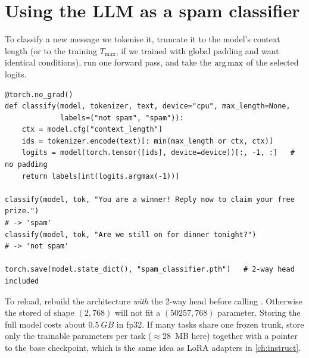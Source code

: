 \section{Using the LLM as a spam classifier}\label{sec:classify:use}

To classify a new message we tokenise it, truncate it to the model's context
length (or to the training $T_{\max}$, if we trained with global padding and want
identical conditions), run one forward pass, and take the $\operatorname*{arg\,max}$ of the selected
logits.

\begin{lstlisting}[caption={Inference with the fine-tuned classifier.},label={lst:classify:infer}]
@torch.no_grad()
def classify(model, tokenizer, text, device="cpu", max_length=None,
             labels=("not spam", "spam")):
    ctx = model.cfg["context_length"]
    ids = tokenizer.encode(text)[: min(max_length or ctx, ctx)]
    logits = model(torch.tensor([ids], device=device))[:, -1, :]   # no padding
    return labels[int(logits.argmax(-1))]

classify(model, tok, "You are a winner! Reply now to claim your free prize.")
# -> 'spam'
classify(model, tok, "Are we still on for dinner tonight?")
# -> 'not spam'

torch.save(model.state_dict(), "spam_classifier.pth")   # 2-way head included
\end{lstlisting}

To reload, rebuild the architecture \emph{with} the 2-way head before calling
. Otherwise the stored  of shape
$(2, 768)$ will not fit a $(50257, 768)$ parameter. Storing the full model costs about
$\SI{0.5}{GB}$ in fp32. If many tasks share one frozen trunk, store only the
trainable parameters per task ($\approx$\SI{28}{MB} here) together with a pointer to
the base checkpoint, which is the same idea as LoRA adapters in \cref{ch:instruct}.

